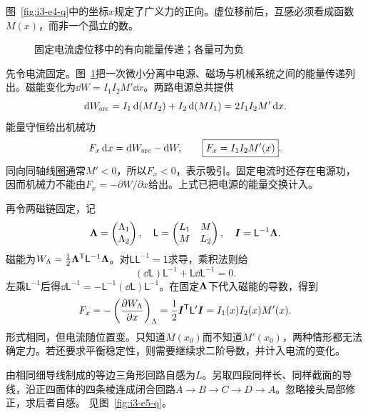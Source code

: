 \begin{solution}
图~\ref{fig:i3-e4-q}中的坐标$x$规定了广义力的正向。虚位移前后，互感必须看成函数$M(x)$，而非一个孤立的数。


\begin{figure}[H]\centering
{}
\caption{固定电流虚位移中的有向能量传递；各量可为负}\label{fig:i3-e4-s}
\end{figure}

先令电流固定。图~\ref{fig:i3-e4-s}把一次微小分离中电源、磁场与机械系统之间的能量传递列出。磁能变化为$\dd W=I_1I_2M'\dd x$。两路电源总共提供
\[
\mathop{}\!\mathrm d W_{\rm src}=I_1\mathop{}\!\mathrm d(MI_2)+I_2\mathop{}\!\mathrm d(MI_1)
=2I_1I_2M'\mathop{}\!\mathrm d x .
\]
能量守恒给出机械功
\[
F_x\mathop{}\!\mathrm d x=\mathop{}\!\mathrm d W_{\rm src}-\mathop{}\!\mathrm d W,\qquad
\boxed{F_x=I_1I_2M'(x)}.
\]
同向同轴线圈通常$M'<0$，所以$F_x<0$，表示吸引。固定电流时还存在电源功，因而机械力不能由$F_x=-\partial W/\partial x$给出。上式已把电源的能量交换计入。

再令两磁链固定，记
\[
\bm{\Lambda}=\begin{pmatrix}\Lambda_1\\\Lambda_2\end{pmatrix},\quad
\mathsf L=\begin{pmatrix}L_1&M\\M&L_2\end{pmatrix},\quad
\bm{I}=\mathsf L^{-1}\bm{\Lambda} .
\]
磁能为$W_\Lambda=\tfrac12\bm{\Lambda}^{\mathsf T}\mathsf L^{-1}\bm{\Lambda}$。对$\mathsf L\mathsf L^{-1}=\mathsf 1$求导，乘积法则给
\[(\dd\mathsf L)\mathsf L^{-1}+\mathsf L\dd\mathsf L^{-1}=0.\]
左乘$\mathsf L^{-1}$后得$\dd\mathsf L^{-1}=-\mathsf L^{-1}(\dd\mathsf L)\mathsf L^{-1}$。在固定$\bm{\Lambda}$下代入磁能的导数，得到
\[
F_x=-\left(\frac{\partial W_\Lambda}{\partial x}\right)_\Lambda
=\frac12\bm{I}^{\mathsf T}\mathsf L'\bm{I}=I_1(x)I_2(x)M'(x).
\]
形式相同，但电流随位置变。只知道$M(x_0)$而不知道$M'(x_0)$，两种情形都无法确定力。若还要求平衡稳定性，则需要继续求二阶导数，并计入电流的变化。
\end{solution}

\begin{example}[等边三角形折成四面体回路]\label{ex:i3-e5}

由相同细导线制成的等边三角形回路自感为$L$。另取四段同样长、同样截面的导线，沿正四面体的四条棱连成闭合回路$A\to B\to C\to D\to A$。忽略接头局部修正，求后者自感。
 见图~\ref{fig:i3-e5-q}。
\end{example}

